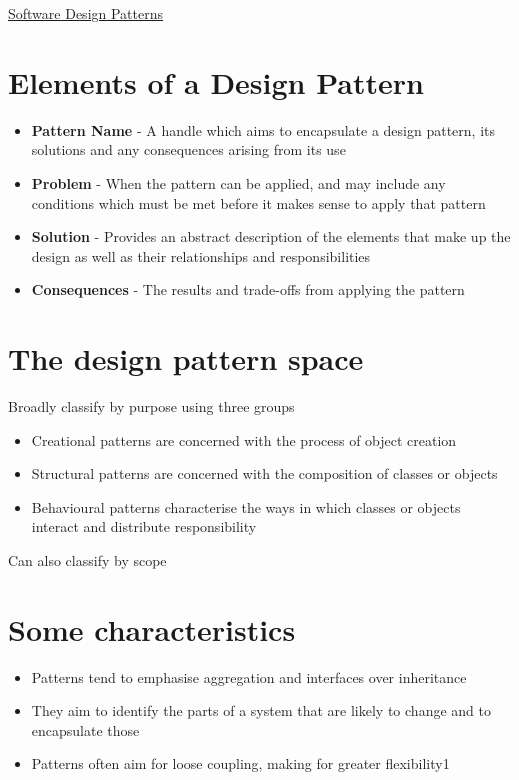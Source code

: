 \documentclass{article}[18pt]
\begin{document}
\begin{center}
\underline{\huge Software Design Patterns}
\end{center}
\section{Elements of a Design Pattern}
\begin{itemize}
	\item \textbf{Pattern Name} - A handle which aims to encapsulate a design pattern, its solutions and any consequences arising from its use
	\item \textbf{Problem} - When the pattern can be applied, and may include any conditions which must be met before it makes sense to apply that pattern
	\item \textbf{Solution} - Provides an abstract description of the elements that make up the design as well as their relationships and responsibilities
	\item \textbf{Consequences} - The results and trade-offs from applying the pattern
\end{itemize}
\section{The design pattern space}
Broadly classify by purpose using three groups
\begin{itemize}
	\item Creational patterns are concerned with the process of object creation
	\item Structural patterns are concerned with the composition of classes or objects
	\item Behavioural patterns characterise the ways in which classes or objects interact and distribute responsibility
\end{itemize}
Can also classify by scope
\section{Some characteristics}
\begin{itemize}
	\item Patterns tend to emphasise aggregation and interfaces over inheritance
	\item They aim to identify the parts of a system that are likely to change and to encapsulate those
	\item Patterns often aim for loose coupling, making for greater flexibility1
\end{itemize}
\end{document}
